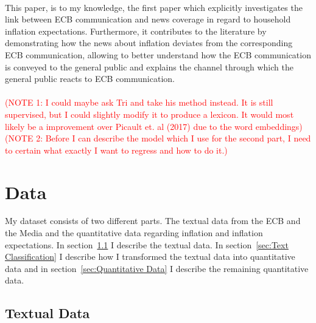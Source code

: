 \documentclass[review]{elsarticle}
\begin{document}
\\
This paper, is to my knowledge, the first paper which explicitly investigates the link between ECB communication and news coverage in regard to household inflation expectations. Furthermore, it contributes to the literature by demonstrating how the news about inflation deviates from the corresponding ECB communication, allowing to better understand how the ECB communication is conveyed to the general public and explains the channel through which the general public reacts to ECB communication.
\\
\\
\textcolor{red}{(NOTE 1: I could maybe ask Tri and take his method instead. It is still supervised, but I could slightly modify it to produce a lexicon. It would most likely be a improvement over Picault et. al (2017) due to the word embeddings)}
\textcolor{red}{(NOTE 2: Before I can describe the model which I use for the second part, I need to certain what exactly I want to regress and how to do it.)}
\section{Data} \label{sec:Data}

My dataset consists of two different parts. The textual data from the ECB and the Media and the quantitative data regarding inflation and inflation expectations. In  section~\ref{sec:Textual Data} I describe the textual data. In section~\ref{sec:Text Classification} I describe how I transformed the textual data into quantitative data and in section~\ref{sec:Quantitative Data} I describe the remaining quantitative data.

\subsection{Textual Data} \label{sec:Textual Data}
\end{document}
